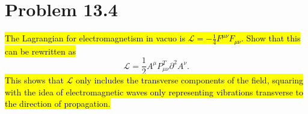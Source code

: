 \documentclass{article}
\begin{document}
\section*{Problem 13.4}
\begin{quoting}
  \hl{The Lagrangian for electromagnetism in vacuo is $\mathcal{L}=-\frac{1}{4}F^{\mu\nu}F_{\mu\nu}$. Show that this can be rewritten as}\[\mathcal{L}=\frac{1}{2}A^\mu P^T_{\mu\nu}\partial^2A^\nu.\]
  \hl{This shows that $\mathcal{L}$ only includes the transverse components of the field, squaring with the idea of electromagnetic waves only representing vibrations transverse to the direction of propagation.}
\end{quoting}
\end{document}
